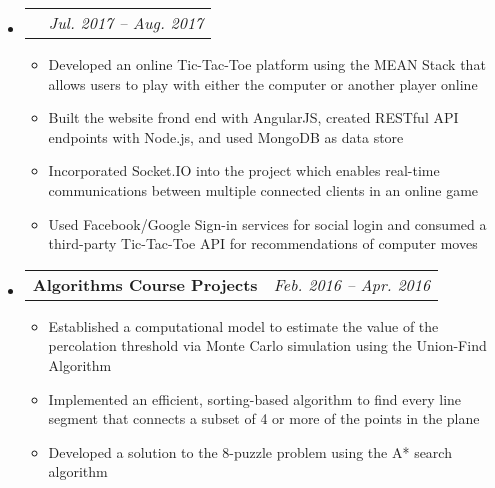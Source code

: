 \documentclass{article}
\makeatletter
\newcommand{\resitem}[1]{
    \item #1
    \vspace{-2pt}
}
\newcommand{\ressubheadingproj}[2]{
\begin{tabular*}{6.80in}{l@{\extracolsep{\fill}}r}
    \textbf{#1} & \textit{#2} \\
\end{tabular*}\vspace{-6pt}}
\makeatother
\begin{document}
    \begin{itemize}
        \item\ressubheadingproj
        {\href
        {https://github.com/jeremylinlin/tic-tac-toe-mean}
        {Multiplayer Tic-Tac-Toe Game Platform}
        }
        {Jul. 2017 -- Aug. 2017}
        {\footnotesize
        \begin{itemize}
            \resitem
            {Developed an online Tic-Tac-Toe platform using the MEAN Stack that allows
            users to play with either the computer or another player online}
            \resitem
            {Built the website frond end with AngularJS, created RESTful
            API endpoints with Node.js, and used MongoDB as data store}
            \resitem
            {Incorporated Socket.IO into the project which enables real-time
            communications between multiple connected clients in an online game}
            \resitem
            {Used Facebook/Google Sign-in services for social login and consumed a
            third-party Tic-Tac-Toe API for recommendations of computer moves}
        \end{itemize}
        }
    \end{itemize}

    \begin{itemize}
        \item\ressubheadingproj
        {Algorithms Course Projects}{Feb. 2016 -- Apr. 2016}
        {\footnotesize
        \begin{itemize}
            \resitem
            {Established a computational model to estimate the value of the percolation
            threshold via Monte Carlo simulation using the Union-Find Algorithm}
            \resitem
            {Implemented an efficient, sorting-based algorithm to find every line segment
            that connects a subset of 4 or more of the points in the plane}
            \resitem
            {Developed a solution to the 8-puzzle problem using the A* search algorithm}
        \end{itemize}
        }
    \end{itemize}

\end{document}
